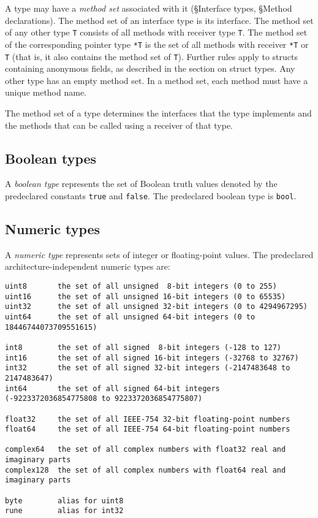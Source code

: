 A type may have a \emph{method set} associated with it
(§Interface types,
§Method declarations). The method set
of an interface type is its interface. The
method set of any other type \texttt{T} consists of all methods with
receiver type \texttt{T}. The method set of the corresponding pointer
type \texttt{*T} is the set of all methods with receiver \texttt{*T} or
\texttt{T} (that is, it also contains the method set of \texttt{T}).
Further rules apply to structs containing anonymous fields, as described
in the section on struct types. Any other type
has an empty method set. In a method set, each method must have a
unique
method name.

The method set of a type determines the interfaces that the type
implements and the methods that can be
called using a receiver of that type.

\subsection*{Boolean types}

A \emph{boolean type} represents the set of Boolean truth values denoted
by the predeclared constants \texttt{true} and \texttt{false}. The
predeclared boolean type is \texttt{bool}.

\subsection*{Numeric types}

A \emph{numeric type} represents sets of integer or floating-point
values. The predeclared architecture-independent numeric types are:

\begin{Verbatim}[frame=single]
uint8       the set of all unsigned  8-bit integers (0 to 255)
uint16      the set of all unsigned 16-bit integers (0 to 65535)
uint32      the set of all unsigned 32-bit integers (0 to 4294967295)
uint64      the set of all unsigned 64-bit integers (0 to 18446744073709551615)

int8        the set of all signed  8-bit integers (-128 to 127)
int16       the set of all signed 16-bit integers (-32768 to 32767)
int32       the set of all signed 32-bit integers (-2147483648 to 2147483647)
int64       the set of all signed 64-bit integers (-9223372036854775808 to 9223372036854775807)

float32     the set of all IEEE-754 32-bit floating-point numbers
float64     the set of all IEEE-754 64-bit floating-point numbers

complex64   the set of all complex numbers with float32 real and imaginary parts
complex128  the set of all complex numbers with float64 real and imaginary parts

byte        alias for uint8
rune        alias for int32
\end{Verbatim}

